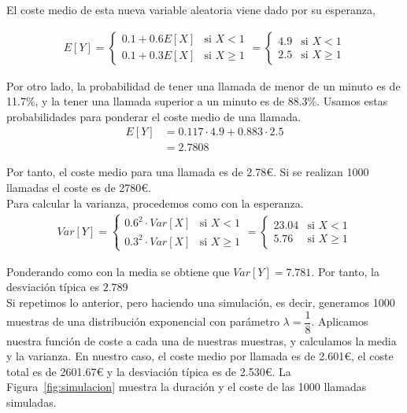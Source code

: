 \documentclass[12pt,a4paper,twoside,openright,titlepage,final]{article}
\begin{document}
El coste medio de esta nueva variable aleatoria viene dado por su esperanza,

\begin{align*}
E[Y] = \begin{cases}
0.1 + 0.6E[X] & \text{si } X < 1 \\
0.1 + 0.3E[X] & \text{si } X \geq 1
\end{cases} = \begin{cases}
4.9 & \text{si } X < 1 \\
2.5 & \text{si } X \geq 1
\end{cases}
\end{align*}

Por otro lado, la probabilidad de tener una llamada de menor de un minuto es de 11.7\%, y la tener una llamada superior a un minuto es de 88.3\%. Usamos estas probabilidades para ponderar el coste medio de una llamada.\\

\begin{align*}
E[Y] & = 0.117 \cdot 4.9 + 0.883 \cdot 2.5 \\
& = 2.7808
\end{align*}

Por tanto, el coste medio para una llamada es de 2.78€. Si se realizan 1000 llamadas el coste es de 2780€.\\

Para calcular la varianza, procedemos como con la esperanza.\\

\begin{align*}
Var[Y] = \begin{cases}
0.6^2 \cdot Var[X] & \text{si } X < 1 \\
0.3^2 \cdot Var[X] & \text{si } X \geq 1
\end{cases} = \begin{cases}
23.04  & \text{si } X < 1 \\
5.76 & \text{si } X \geq 1
\end{cases}
\end{align*} 

Ponderando como con la media se obtiene que $Var[Y] = 7.781$. Por tanto, la desviación típica es $2.789$\\

Si repetimos lo anterior, pero haciendo una simulación, es decir, generamos 1000 muestras de una distribución exponencial con parámetro $\lambda = \dfrac{1}{8}$. Aplicamos nuestra función de coste a cada una de nuestras muestras, y calculamos la media y la varianza. En nuestro caso, el coste medio por llamada es de 2.601€, el coste total es de 2601.67€ y la desviación típica es de 2.530€. La Figura~\ref{fig:simulacion} muestra la duración y el coste de las 1000 llamadas simuladas.\\
\end{document}
